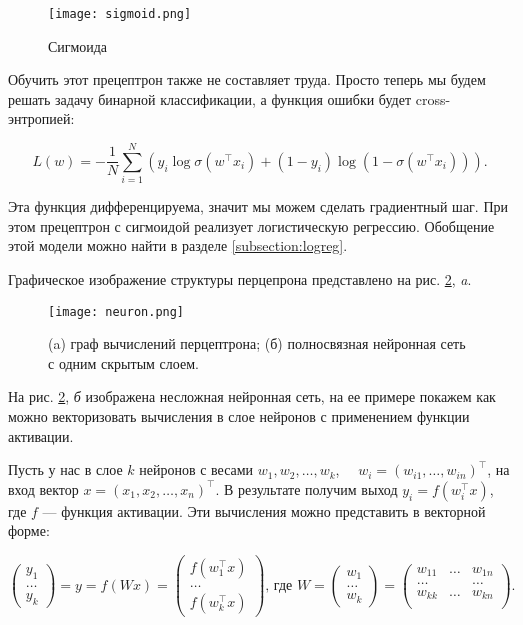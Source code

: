 \begin{figure}[ht]
    \centering
    \texttt{[image: sigmoid.png]}
    \caption{Сигмоида}
    \label{fig:sigmoid}
\end{figure}

Обучить этот прецептрон также не составляет труда. Просто теперь мы будем решать задачу бинарной классификации, а функция ошибки будет cross-энтропией:

\begin{equation}
 L(w) = -\frac{1}{N}\sum_{i=1}^N(y_i\log\sigma(w^\top x_i) + (1-y_i)\log(1-\sigma(w^\top x_i))).
\end{equation}

Эта функция дифференцируема, значит мы можем сделать градиентный шаг. При этом прецептрон с сигмоидой реализует логистическую регрессию. Обобщение этой модели можно найти в разделе \ref{subsection:logreg}.

Графическое изображение структуры перцепрона представлено на рис. \ref{fig:neuron}, \textit{a}.

\begin{figure}[ht]
    \centering
    \texttt{[image: neuron.png]}
    \caption{(a) граф вычислений перцептрона; (б) полносвязная нейронная сеть с одним скрытым слоем.}
    \label{fig:neuron}
\end{figure}

На  рис. \ref{fig:neuron}, \textit{б} изображена несложная нейронная сеть, на ее примере покажем как можно векторизовать вычисления в слое нейронов с применением функции активации.

Пусть у нас в слое $k$ нейронов с весами $w_1, w_2, \ldots, w_k$, $\quad w_i = (w_{i1}, \ldots, w_{in})^\top$, на вход вектор $x = (x_1, x_2, \ldots, x_n)^\top$. В результате получим выход $y_i = f(w_i^\top x)$, где $f$ --- функция активации. Эти вычисления можно представить в векторной форме:

\begin{equation*}
\begin{pmatrix}
   y_1 \\
   \ldots \\
   y_k
\end{pmatrix} = y = f(Wx) =
\begin{pmatrix}
   f(w_1^\top x)\\
   \ldots \\
   f(w_k^\top x)
\end{pmatrix}\text{, где } W =
\begin{pmatrix}
   w_1 \\
   \ldots \\
   w_k
\end{pmatrix} =
\begin{pmatrix}
   w_{11} & \ldots & w_{1n}\\
   \ldots &  & \ldots\\
   w_{kk} & \ldots & w_{kn}\\
\end{pmatrix}.
\end{equation*}


